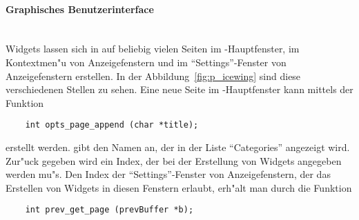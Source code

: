 \paragraph{Graphisches Benutzerinterface}\hfill\\

Widgets lassen sich in \icewing{} auf beliebig vielen Seiten im
\icewing-Hauptfenster, im Kontextmen"u von Anzeigefenstern und im
``Settings''-Fenster von Anzeigefenstern erstellen. In der
Abbildung~\ref{fig:p_icewing} sind diese verschiedenen Stellen zu
sehen. Eine neue Seite im \icewing-Hauptfenster kann mittels der
Funktion
\begin{small}
\linespread{0.9}
\begin{verbatim}
    int opts_page_append (char *title);
\end{verbatim}
\end{small}
erstellt werden.  gibt den Namen an, der in der Liste
``Categories'' angezeigt wird. Zur"uck gegeben wird ein Index, der
bei der Erstellung von Widgets angegeben werden mu"s. Den Index der
``Settings''-Fenster von Anzeigefenstern, der das Erstellen von
Widgets in diesen Fenstern erlaubt, erh"alt man durch die Funktion
\begin{small}
\linespread{0.9}
\begin{verbatim}
    int prev_get_page (prevBuffer *b);
\end{verbatim}
\end{small}

